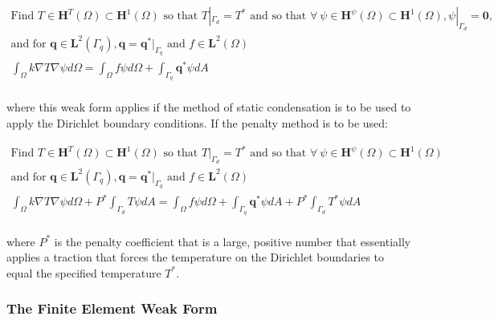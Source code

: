 \documentclass[10pt]{article}
\begin{document}
\begin{tcolorbox}
\begin{equation}
\label{eq:WeakFormQ1}
\begin{aligned}
\text{Find }T\in \textbf{H}^T(\Omega)\subset \textbf{H}^1(\Omega) \text{ so that } T|_{\Gamma_d}=T^{*} \text{ and so that }\forall\ \psi \in \textbf{H}^\psi(\Omega)\subset \textbf{H}^1(\Omega), \psi|_{\Gamma_d}=\textbf{0},\\
\text{and for }\textbf{q}\in\textbf{L}^2(\Gamma_q), \textbf{q}=\textbf{q}^{*}|_{\Gamma_q}\text{ and }f\in\textbf{L}^2(\Omega)\\
\int_{\Omega}k\nabla T\nabla\psi d\Omega=\int_{\Omega}f\psi d\Omega+\int_{\Gamma_q}\textbf{q}^{*}\psi dA\\
\end{aligned}
\end{equation}
\end{tcolorbox}

where this weak form applies if the method of static condensation is to be used to apply the Dirichlet boundary conditions. If the penalty method is to be used:

\begin{tcolorbox}
\begin{equation}
\label{eq:WeakFormQ2}
\begin{aligned}
\text{Find }T\in \textbf{H}^T(\Omega)\subset \textbf{H}^1(\Omega) \text{ so that } T|_{\Gamma_d}=T^{*} \text{ and so that }\forall\ \psi \in \textbf{H}^\psi(\Omega)\subset \textbf{H}^1(\Omega)\\
\text{and for }\textbf{q}\in\textbf{L}^2(\Gamma_q), \textbf{q}=\textbf{q}^{*}|_{\Gamma_q}\text{ and }f\in\textbf{L}^2(\Omega)\\
\int_{\Omega}k\nabla T\nabla\psi d\Omega+P^{*}\int_{\Gamma_d}T\psi dA=\int_{\Omega}f\psi d\Omega+\int_{\Gamma_q}\textbf{q}^{*}\psi dA+P^{*}\int_{\Gamma_d}T^{*}\psi dA\\
\end{aligned}
\end{equation}
\end{tcolorbox}

where \(P^{*}\) is the penalty coefficient that is a large, positive number that essentially applies a traction that forces the temperature on the Dirichlet boundaries to equal the specified temperature \(T^{*}\). 

\subsubsection{The Finite Element Weak Form}
\end{document}

